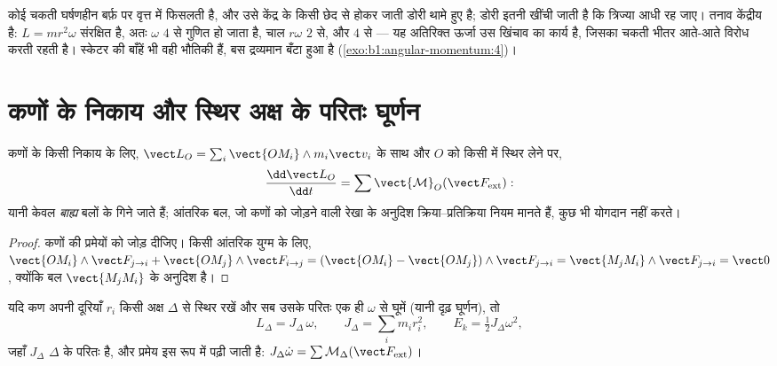 \begin{example}[चकती को भीतर खींचना]\label{ex:b1:angular-momentum:puck}
कोई चकती घर्षणहीन बर्फ़ पर वृत्त में फिसलती है, और उसे केंद्र के किसी छेद
से होकर जाती डोरी थामे हुए है; डोरी इतनी खींची जाती है कि त्रिज्या आधी रह
जाए। तनाव केंद्रीय है: $L = mr^2\omega$ संरक्षित है, अतः $\omega$ $4$ से
गुणित हो जाता है, चाल $r\omega$ $2$ से, और  $4$ से
--- यह अतिरिक्त ऊर्जा उस खिंचाव का कार्य है, जिसका चकती भीतर आते-आते विरोध
करती रहती है। स्केटर की बाँहें भी वही भौतिकी हैं, बस द्रव्यमान बँटा हुआ है
(\cref{exo:b1:angular-momentum:4})।
\end{example}

\section{कणों के निकाय और स्थिर अक्ष के परितः घूर्णन}

\begin{theorem}[किसी निकाय का कोणीय संवेग]\label{thm:b1:angular-momentum:system}
कणों के किसी निकाय के लिए, $\vect L_O = \sum_i\vect{OM_i}\wedge m_i\vect v_i$
के साथ और $O$ को किसी  में स्थिर लेने पर,
\[
\frac{\dd\vect L_O}{\dd t} = \sum\vect{\mathcal M}_O(\vect F_{\mathrm{ext}}):
\]
यानी केवल \emph{बाह्य} बलों के  गिने जाते हैं; आंतरिक बल, जो कणों को
जोड़ने वाली रेखा के अनुदिश क्रिया--प्रतिक्रिया नियम मानते हैं, कुछ भी योगदान
नहीं करते।
\end{theorem}

\begin{proof}
कणों की प्रमेयों को जोड़ दीजिए। किसी आंतरिक युग्म के लिए, $\vect{OM_i}\wedge\vect F_{j\to i}
+ \vect{OM_j}\wedge\vect F_{i\to j} = (\vect{OM_i} - \vect{OM_j})\wedge\vect F_{j\to i}
= \vect{M_jM_i}\wedge\vect F_{j\to i} = \vect 0$, क्योंकि बल
$\vect{M_jM_i}$ के अनुदिश है।
\end{proof}

\begin{proposition}[स्थिर अक्ष के परितः दृढ़ घूर्णन]\label{prop:b1:angular-momentum:inertia}
यदि कण अपनी दूरियाँ $r_i$ किसी अक्ष $\Delta$ से स्थिर रखें और सब उसके परितः
एक ही  $\omega$ से घूमें (यानी दृढ़ घूर्णन), तो
\[
L_\Delta = J_\Delta\,\omega, \qquad J_\Delta = \sum_i m_ir_i^2, \qquad
E_k = \tfrac12 J_\Delta\omega^2,
\]
जहाँ $J_\Delta$ $\Delta$ के परितः \emph{} है, और प्रमेय इस रूप
में पढ़ी जाती है: $J_\Delta\dot\omega = \sum\mathcal M_\Delta(\vect F_{\mathrm{ext}})$।
\end{proposition}

